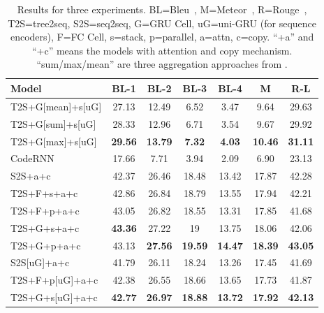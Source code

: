 \setlength{\tabcolsep}{1.5mm}
\begin{table}[t]
\centering
\scriptsize
\begin{tabular}{lcccccc}
\toprule
\textbf{Model} & \textbf{BL-1} & \textbf{BL-2} & \textbf{BL-3} & \textbf{BL-4} & \textbf{M}  & \textbf{R-L} \\
\midrule
T2S+G[mean]+s[uG] &  27.13  &  12.49  &  6.52  &  3.47  &  9.64   &  29.63  \\
T2S+G[sum]+s[uG]&  28.33  &  12.96  &  6.71  &  3.54  &  9.67   &  29.92  \\
T2S+G[max]+s[uG]&  \textbf{29.56}  &  \textbf{13.79}  &  \textbf{7.32}  &  \textbf{4.03}  &  \textbf{10.46}   &  \textbf{31.11}  \\
\midrule
CodeRNN   &  17.66      &  7.71      &  3.94      &  2.09      &  6.90      &  23.13     \\
S2S+a+c &  42.37  &  26.46  &  18.48  &  13.42  &  17.87  &  42.28 \\
T2S+F+s+a+c&  42.86      &  26.84      &  18.79      &  13.55      &  17.94      &  42.21    \\
T2S+F+p+a+c&  43.05      &  26.82      &  18.55    &  13.31      &  17.85      &  41.68     \\
T2S+G+s+a+c&  \textbf{43.36}  &  27.22  &  19  &  13.75  &  18.06  &  42.06 \\
T2S+G+p+a+c&  43.13     &  \textbf{27.56}      &  \textbf{19.59}      &  \textbf{14.47}      &  \textbf{18.39}     &  \textbf{43.05}     \\
\midrule
S2S[uG]+a+c   &  41.79  &  26.11  &  18.24  &  13.26  &  17.45 &  41.69 \\
T2S+F+p[uG]+a+c &  42.38  &  26.55  &  18.66  &  13.65  &  17.73   &  41.87  \\
T2S+G+s[uG]+a+c  &  \textbf{42.77}  &  \textbf{26.97}  &  \textbf{18.88}  &  \textbf{13.72}  &  \textbf{17.92}  &  \textbf{42.13} \\
\bottomrule
\end{tabular}
\caption{Results for three experiments. BL=Bleu~\cite{papineni2002bleu}, M=Meteor~\cite{denkowski2014meteor}, R=Rouge~\cite{lin2004rouge},
T2S=tree2seq, S2S=seq2seq, G=GRU Cell, uG=uni-GRU (for sequence encoders),
F=FC Cell, s=stack, p=parallel, a=attn, c=copy.  ``+a'' and ``+c'' means
the models with attention and copy mechanism. ``sum/max/mean'' 
are three\textbf{} aggregation approaches from .}
\label{table:results}
\end{table}

